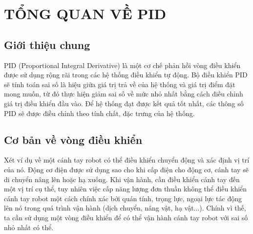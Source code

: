 
\chapter{ TỔNG QUAN VỀ PID} %

\label{Chapter1} %


\newcommand{\keyword}[1]{\textbf{#1}}
\newcommand{\tabhead}[1]{\textbf{#1}}
\newcommand{\code}[1]{\texttt{#1}}
\newcommand{\file}[1]{\texttt{\bfseries#1}}
\newcommand{\option}[1]{\texttt{\itshape#1}}


\section{Giới thiệu chung}

PID (Proportional Integral Derivative) là một cơ chế phản hồi vòng điều khiển được sử dụng rộng rãi trong các hệ thống điều khiển tự động. Bộ điều khiển PID sẽ tính toán sai số là hiệu giữa giá trị trả về của hệ thống và giá trị điểm đặt mong muốn, từ đó thực hiện giảm sai số về mức nhỏ nhất bằng cách điều chỉnh giá trị điều khiển đầu vào. Để hệ thống đạt được kết quả tốt nhất, các thông số PID sẽ được điều chỉnh theo tính chất, đặc trưng của hệ thống.
 
\section{Cơ bản về vòng điều khiển}

Xét ví dụ về một cánh tay robot có thể điều khiển chuyển động và xác định vị trí của nó. Động cơ điện được sử dụng sao cho khi cấp điện cho động cơ, cánh tay sẽ di chuyển nâng lên hoặc hạ xuống. Khi vận hành, cần điều khiển cánh tay đến một vị trí cụ thể, tuy nhiên việc cấp năng lượng đơn thuần không thể điều khiển cánh tay robot một cách chính xác bởi quán tính, trọng lực, ngoại lực tác động lên nó trong quá trình vận hành (dịch chuyển, nâng vật, hạ vật...). Chính vì thế, ta cần sử dụng một vòng điều khiển để có thể vận hành cánh tay robot với sai số nhỏ nhất có thể.

